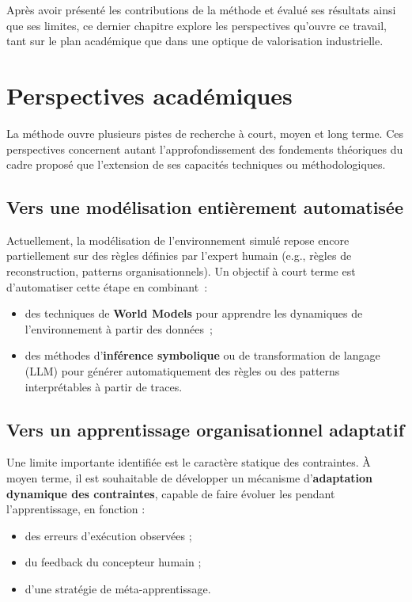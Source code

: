\noindent
Après avoir présenté les contributions de la méthode  et évalué ses résultats ainsi que ses limites, ce dernier chapitre explore les perspectives qu’ouvre ce travail, tant sur le plan académique que dans une optique de valorisation industrielle.

\section{Perspectives académiques}
\label{sec:perspectives_academiques}

\noindent
La méthode  ouvre plusieurs pistes de recherche à court, moyen et long terme. Ces perspectives concernent autant l’approfondissement des fondements théoriques du cadre proposé que l’extension de ses capacités techniques ou méthodologiques.

\subsection*{Vers une modélisation entièrement automatisée}

Actuellement, la modélisation de l’environnement simulé repose encore partiellement sur des règles définies par l’expert humain (e.g., règles de reconstruction, patterns organisationnels). Un objectif à court terme est d’automatiser cette étape en combinant~:
\begin{itemize}
    \item des techniques de \textbf{World Models} pour apprendre les dynamiques de l’environnement à partir des données~;
    \item des méthodes d’\textbf{inférence symbolique} ou de transformation de langage (LLM) pour générer automatiquement des règles ou des patterns interprétables à partir de traces.
\end{itemize}

\subsection*{Vers un apprentissage organisationnel adaptatif}

Une limite importante identifiée est le caractère statique des contraintes. À moyen terme, il est souhaitable de développer un mécanisme d’\textbf{adaptation dynamique des contraintes}, capable de faire évoluer les  pendant l’apprentissage, en fonction :
\begin{itemize}
    \item des erreurs d’exécution observées ;
    \item du feedback du concepteur humain ;
    \item d’une stratégie de méta-apprentissage.
\end{itemize}

